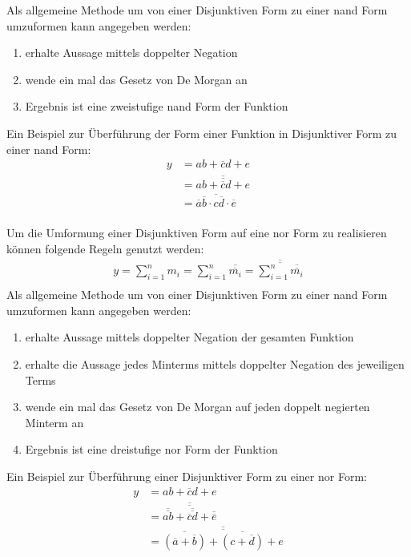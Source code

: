Als allgemeine Methode um von einer Disjunktiven Form zu einer {\sc nand} Form umzuformen kann angegeben werden:
\begin{enumerate}
  \item erhalte Aussage mittels doppelter Negation
  \item wende ein mal das Gesetz von De Morgan an
  \item Ergebnis ist eine zweistufige {\sc nand} Form der Funktion
\end{enumerate}
Ein Beispiel zur Überführung der Form einer Funktion in Disjunktiver Form zu einer {\sc nand} Form: 
\begin{align*}
	y &= ab + \overline{c}d + e \\
	  &= \overline{\overline{ab + \overline{c}d + e}} \\
	  &= \overline{\overline{a}\overline{b} \cdot c\overline{d} \cdot \overline{e}} \\
\end{align*}

Um die Umformung einer Disjunktiven Form auf eine {\sc nor} Form zu realisieren können folgende Regeln genutzt werden:
\begin{align*}
	y = \sum_{i=1}^n m_i = \sum_{i=1}^n \overline{\overline{m_i}} 
		= \overline{\overline{\sum_{i=1}^n \overline{\overline{m_i}}}} \\
\end{align*}
Als allgemeine Methode um von einer Disjunktiven Form zu einer {\sc nand} Form umzuformen kann angegeben werden:
\begin{enumerate}
  \item erhalte Aussage mittels doppelter Negation der gesamten Funktion
  \item erhalte die Aussage jedes Minterms mittels doppelter Negation des jeweiligen Terms
  \item wende ein mal das Gesetz von De Morgan auf jeden doppelt negierten Minterm an
  \item Ergebnis ist eine dreistufige {\sc nor} Form der Funktion
\end{enumerate}
Ein Beispiel zur Überführung einer Disjunktiver Form zu einer {\sc nor} Form: 
\begin{align*}
	y &= ab + \overline{c}d + e \\
	  &= \overline{\overline{\overline{\overline{ab}} + \overline{\overline{\overline{c}d}} 
	  	+ \overline{\overline{e}}}} \\	  
	  &= \overline{\overline{\overline{(\overline{a} + \overline{b})} + \overline{(c + \overline{d})} + e}} \\
\end{align*}

